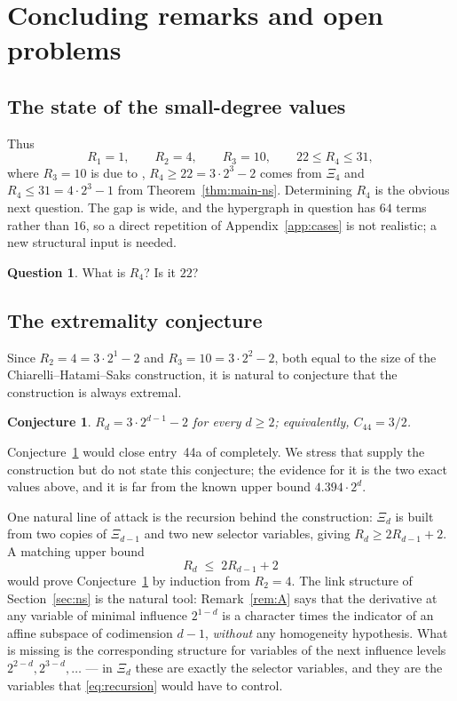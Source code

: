 \documentclass[11pt,reqno]{amsart}
\theoremstyle{plain}
\newtheorem{conjecture}[theorem]{Conjecture}
\theoremstyle{definition}
\newtheorem{question}[theorem]{Question}
\numberwithin{theorem}{section}
\newcommand{\XiC}{\Xi}
\begin{document}
\section{Concluding remarks and open problems}\label{sec:open}

\subsection{The state of the small-degree values}
Thus
\[
  R_1 = 1, \qquad R_2 = 4, \qquad R_3 = 10, \qquad 22 \le R_4 \le 31,
\]
where $R_3 = 10$ is due to \cite{TK00}, $R_4 \ge 22 = 3 \cdot 2^3 - 2$ comes from $\XiC_4$ and $R_4 \le 31 = 4 \cdot 2^3 - 1$ from
Theorem~\ref{thm:main-ns}. Determining $R_4$ is the obvious next question. The gap is wide, and
the hypergraph in question has $64$ terms rather than $16$, so a direct repetition of
Appendix~\ref{app:cases} is not realistic; a new structural input is needed.

\begin{question}
What is $R_4$? Is it $22$?
\end{question}

\subsection{The extremality conjecture}
Since $R_2 = 4 = 3 \cdot 2^1 - 2$ and $R_3 = 10 = 3 \cdot 2^2 - 2$, both equal to the size of
the Chiarelli--Hatami--Saks construction, it is natural to conjecture that the construction is
always extremal.

\begin{conjecture}\label{conj:chs}
$R_d = 3 \cdot 2^{d-1} - 2$ for every $d \ge 2$; equivalently, $C_{44} = 3/2$.
\end{conjecture}

Conjecture~\ref{conj:chs} would close entry~44a of \cite{TaoOP44a} completely. We stress that
\cite{CHS20} supply the construction but do not state this conjecture; the evidence for it is
the two exact values above, and it is far from the known upper bound $4.394 \cdot 2^d$.

One natural line of attack is the recursion behind the construction: $\XiC_d$ is built from two
copies of $\XiC_{d-1}$ and two new selector variables, giving
$R_d \ge 2 R_{d-1} + 2$. A matching upper bound
\begin{equation}\label{eq:recursion}
  R_d \;\le\; 2 R_{d-1} + 2
\end{equation}
would prove Conjecture~\ref{conj:chs} by induction from $R_2 = 4$. The link structure of
Section~\ref{sec:ns} is the natural tool: Remark~\ref{rem:A} says that the derivative at any
variable of minimal influence $2^{1-d}$ is a character times the indicator of an affine subspace
of codimension $d-1$, \emph{without} any homogeneity hypothesis. What is missing is the
corresponding structure for variables of the next influence levels $2^{2-d}, 2^{3-d}, \dots$ ---
in $\XiC_d$ these are exactly the selector variables, and they are the variables that
\eqref{eq:recursion} would have to control.
\end{document}
